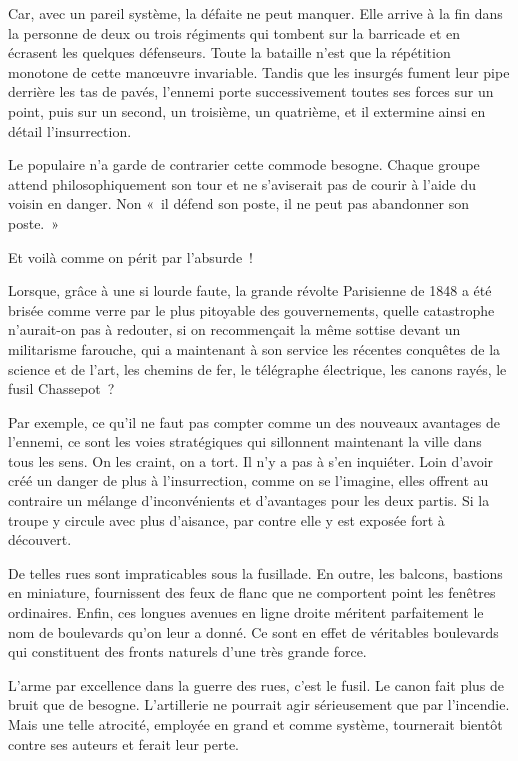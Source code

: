 \documentclass[french,twoside]{book} %
\begin{document}
Car, avec un pareil système, la défaite ne peut manquer. Elle arrive à la fin dans la personne de deux ou trois régiments qui tombent sur la barricade et en écrasent les quelques défenseurs. Toute la bataille n’est que la répétition monotone de cette manœuvre invariable. Tandis que les insurgés fument leur pipe derrière les tas de pavés, l’ennemi porte successivement toutes ses forces sur un point, puis sur un second, un troisième, un quatrième, et il extermine ainsi en détail l’insurrection.\par
Le populaire n’a garde de contrarier cette commode besogne. Chaque groupe attend philosophiquement son tour et ne s’aviserait pas de courir à l’aide du voisin en danger. Non « il défend son poste, il ne peut pas abandonner son poste. »\par
Et voilà comme on périt par l’absurde !\par
Lorsque, grâce à une si lourde faute, la grande révolte Parisienne de 1848 a été brisée comme verre par le plus pitoyable des gouvernements, quelle catastrophe n’aurait-on pas à redouter, si on recommençait la même sottise devant un militarisme farouche, qui a maintenant à son service les récentes conquêtes de la science et de l’art, les chemins de fer, le télégraphe électrique, les canons rayés, le fusil Chassepot ?\par
Par exemple, ce qu’il ne faut pas compter comme un des nouveaux avantages de l’ennemi, ce sont les voies stratégiques qui sillonnent maintenant la ville dans tous les sens. On les craint, on a tort. Il n’y a pas à s’en inquiéter. Loin d’avoir créé un danger de plus à l’insurrection, comme on se l’imagine, elles offrent au contraire un mélange d’inconvénients et d’avantages pour les deux partis. Si la troupe y circule avec plus d’aisance, par contre elle y est exposée fort à découvert.\par
De telles rues sont impraticables sous la fusillade. En outre, les balcons, bastions en miniature, fournissent des feux de flanc que ne comportent point les fenêtres ordinaires. Enfin, ces longues avenues en ligne droite méritent parfaitement le nom de boulevards qu’on leur a donné. Ce sont en effet de véritables boulevards qui constituent des fronts naturels d’une très grande force.\par
L'arme par excellence dans la guerre des rues, c’est le fusil. Le canon fait plus de bruit que de besogne. L'artillerie ne pourrait agir sérieusement que par l’incendie. Mais une telle atrocité, employée en grand et comme système, tournerait bientôt contre ses auteurs et ferait leur perte.\par
\end{document}
